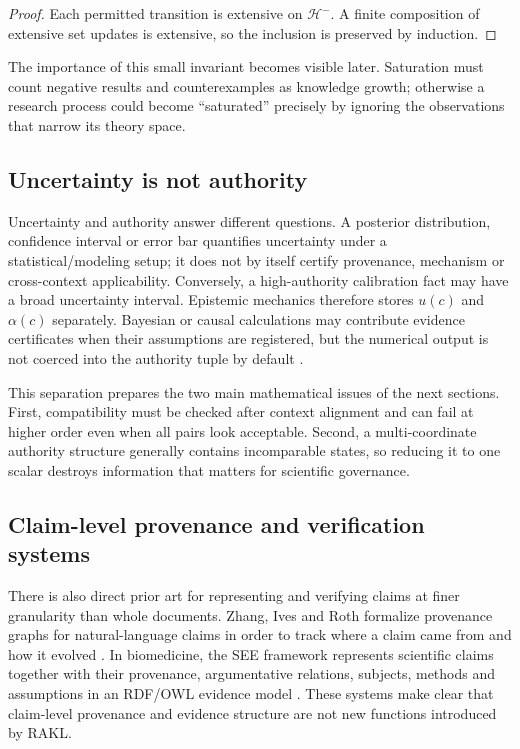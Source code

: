 \documentclass[11pt]{article}
\begin{document}
\begin{proof}
Each permitted transition is extensive on \(\mathcal H^{-}\). A finite composition of extensive set updates is extensive, so the inclusion is preserved by induction.
\end{proof}

The importance of this small invariant becomes visible later. Saturation must count negative results and counterexamples as knowledge growth; otherwise a research process could become ``saturated'' precisely by ignoring the observations that narrow its theory space.

\subsection{Uncertainty is not authority}

Uncertainty and authority answer different questions. A posterior distribution, confidence interval or error bar quantifies uncertainty under a statistical/modeling setup; it does not by itself certify provenance, mechanism or cross-context applicability. Conversely, a high-authority calibration fact may have a broad uncertainty interval. Epistemic mechanics therefore stores \(u(c)\) and \(\alpha(c)\) separately. Bayesian or causal calculations may contribute evidence certificates when their assumptions are registered, but the numerical output is not coerced into the authority tuple by default \cite{pearl2009}.

This separation prepares the two main mathematical issues of the next sections. First, compatibility must be checked after context alignment and can fail at higher order even when all pairs look acceptable. Second, a multi-coordinate authority structure generally contains incomparable states, so reducing it to one scalar destroys information that matters for scientific governance.

\subsection{Claim-level provenance and verification systems}

There is also direct prior art for representing and verifying claims at finer granularity than whole documents. Zhang, Ives and Roth formalize provenance graphs for natural-language claims in order to track where a claim came from and how it evolved \cite{zhang2020claim}. In biomedicine, the SEE framework represents scientific claims together with their provenance, argumentative relations, subjects, methods and assumptions in an RDF/OWL evidence model \cite{boelling2014see}. These systems make clear that claim-level provenance and evidence structure are not new functions introduced by RAKL.
\end{document}
